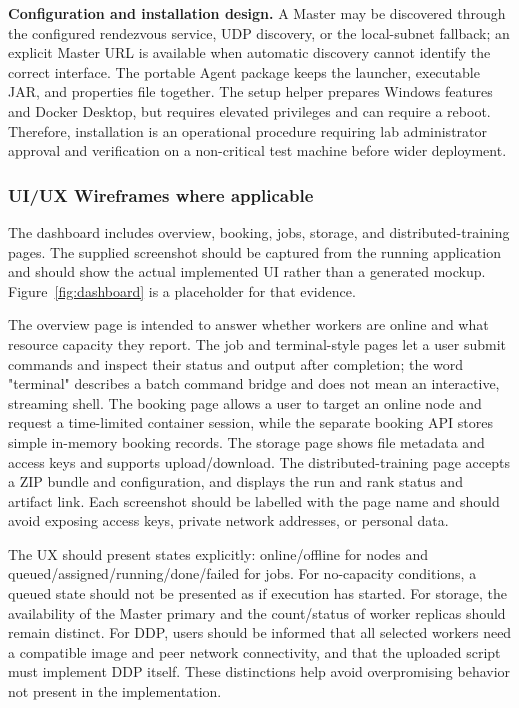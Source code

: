 \documentclass{article}
\begin{document}
\textbf{Configuration and installation design.} A Master may be discovered through the configured rendezvous service, UDP discovery, or the local-subnet fallback; an explicit Master URL is available when automatic discovery cannot identify the correct interface. The portable Agent package keeps the launcher, executable JAR, and properties file together. The setup helper prepares Windows features and Docker Desktop, but requires elevated privileges and can require a reboot. Therefore, installation is an operational procedure requiring lab administrator approval and verification on a non-critical test machine before wider deployment.

    \subsubsection{UI/UX Wireframes where applicable}
The dashboard includes overview, booking, jobs, storage, and distributed-training pages. The supplied screenshot should be captured from the running application and should show the actual implemented UI rather than a generated mockup. Figure~\ref{fig:dashboard} is a placeholder for that evidence.

The overview page is intended to answer whether workers are online and what resource capacity they report. The job and terminal-style pages let a user submit commands and inspect their status and output after completion; the word "terminal" describes a batch command bridge and does not mean an interactive, streaming shell. The booking page allows a user to target an online node and request a time-limited container session, while the separate booking API stores simple in-memory booking records. The storage page shows file metadata and access keys and supports upload/download. The distributed-training page accepts a ZIP bundle and configuration, and displays the run and rank status and artifact link. Each screenshot should be labelled with the page name and should avoid exposing access keys, private network addresses, or personal data.

The UX should present states explicitly: online/offline for nodes and queued/assigned/running/done/failed for jobs. For no-capacity conditions, a queued state should not be presented as if execution has started. For storage, the availability of the Master primary and the count/status of worker replicas should remain distinct. For DDP, users should be informed that all selected workers need a compatible image and peer network connectivity, and that the uploaded script must implement DDP itself. These distinctions help avoid overpromising behavior not present in the implementation.
\end{document}
